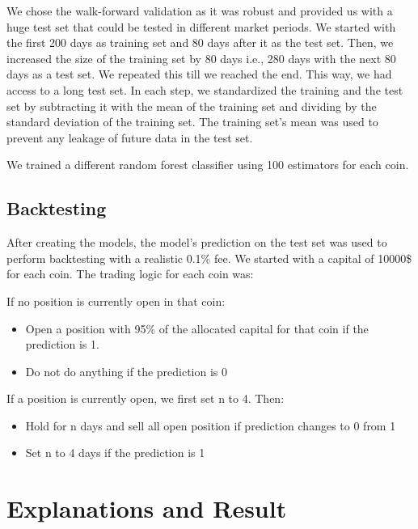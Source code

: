 \documentclass[letterpaper]{article}
\begin{document}
We chose the walk-forward validation as it was robust and provided us with a huge test set that could be 
tested in different market periods. 
We started with the first 200 days as training set and 80 days after it as the test
 set. Then, we increased the size 
 of the training set by 80 days i.e., 280 days with the next 80 days as a test set.
 We repeated this till we reached the end. This way, we had 
 access to a long test set.
 In each step, we standardized the training and the test set by subtracting 
 it with the mean of the training set and 
dividing by the standard deviation of the training set. The training set's mean was used to prevent 
any leakage of future data in the test set. \par 

We trained a different random forest classifier using 100 estimators for each coin.

\subsection{Backtesting}
\label{sec:backtest}
After creating the models, the model's prediction on the test set was used to perform backtesting with a realistic
 0.1\% fee. We started with a capital of 10000\$ for each coin. The trading logic for each coin was:
\bigskip\bigskip



\noindent If no position is currently open in that coin:
 \begin{itemize}
 \item Open a position with 95\% of the allocated capital for that coin if the prediction is 1.
 \item Do not do anything if the prediction is 0
 \end{itemize}
 \bigskip

\noindent If a position is currently open, we first set n to 4. Then:
\begin{itemize}
 \item Hold for n days and sell all open position if prediction changes to 0 from 1
 \item Set n to 4 days if the prediction is 1
\end{itemize}

\bigskip

\section{Explanations and Result}
\label{sec:result}
\end{document}
